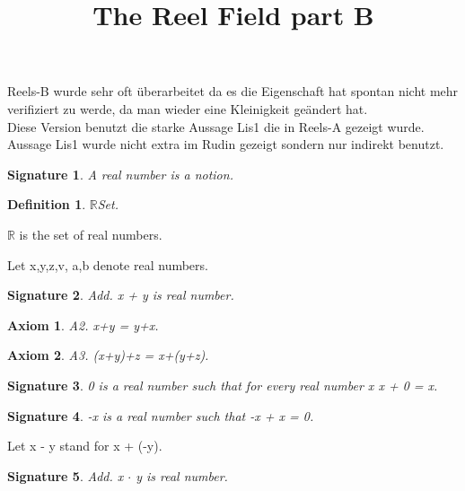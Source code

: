 \documentclass{article}
\newenvironment{forthel}{\begin{leftbar}}{\end{leftbar}}
\newtheorem{axiom}{Axiom}
\newtheorem{definition}{Definition}
\newtheorem{signature}{Signature}
\begin{document}
\title{The Reel Field part B}

\maketitle

Reels-B wurde sehr oft überarbeitet da es die Eigenschaft hat spontan nicht mehr verifiziert zu werde, da man wieder eine Kleinigkeit geändert hat.\\

Diese Version benutzt die starke Aussage Lis1 die in Reels-A gezeigt wurde.\\
Aussage Lis1 wurde nicht extra im Rudin gezeigt sondern nur indirekt benutzt.\\

\begin{forthel}
[set/-s] [element/-s] [number/-s] [integer/-s]

\begin{signature} A real number is a notion.

\end{signature}

\begin{definition} $\mathbb{R}$Set.

\end{definition}
$\mathbb{R}$ is the set of real numbers.

Let x,y,z,v, a,b denote real numbers.



\begin{signature} Add. x + y is real number.

\end{signature}
\begin{axiom} A2. x+y = y+x.

\end{axiom}
\begin{axiom} A3. (x+y)+z = x+(y+z).

\end{axiom}
\begin{signature} 0 is a real number such that for every real number x x + 0 = x.

\end{signature}
\begin{signature} -x is a real number such that -x + x = 0.

\end{signature}

Let x - y stand for x + (-y).

\begin{signature} Add. x $\cdot$ y is real number.


\end{signature}
\end{forthel}
\end{document}
